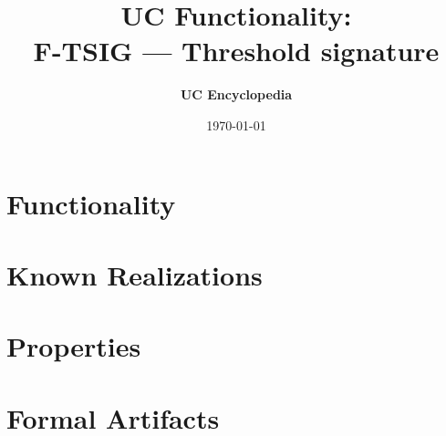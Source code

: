 \documentclass[11pt,a4paper]{article}
\title{\textbf{\Large UC Functionality:}\\[0.2em] \Large F-TSIG --- Threshold signature}
\author{\textbf{UC Encyclopedia}}
\date{\today}
\newtheorem{functionality}{Functionality}
\begin{document}
\maketitle

\begin{abstract}
\end{abstract}

\section{Functionality}

%

\section{Known Realizations}


\section{Properties}


\section{Formal Artifacts}

\end{document}
